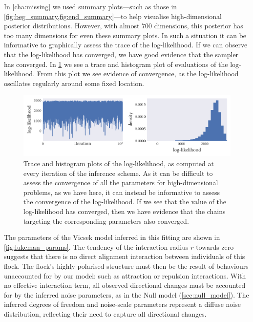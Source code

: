 In \cref{cha:missing} we used summary plots---such as those in
\cref{fig:beg_summary,fig:end_summary}---to help visualise high-dimensional
posterior distributions. However, with almost $700$ dimensions, this posterior
has too many dimensions for even these summary plots. In such a situation it
can be informative to graphically assess the trace of the log-likelihood. If we
can observe that the log-likelihood has converged, we have good evidence that
the sampler has converged. In \cref{fig:log_ll} we see a trace and histogram
plot of evaluations of the log-likelihood. From this plot we see evidence of
convergence, as the log-likelihood oscillates regularly around some fixed
location.

\begin{figure}[tb]
  \includegraphics{log_likelihood.pdf}
  \caption{Trace and histogram plots of the log-likelihood, as computed at
    every iteration of the inference scheme. As it can be difficult to assess
    the convergence of all the parameters for high-dimensional problems, as
    we have here, it can instead be informative to assess the convergence of
    the log-likelihood. If we see that the value of the log-likelihood has
    converged, then we have evidence that the chains targeting the corresponding
    parameters also converged.}
    \label{fig:log_ll}
\end{figure}

The parameters of the Vicsek model inferred in this fitting are shown in
\cref{fig:lukeman_params}. The tendency of the interaction radius $r$ towards
zero suggests that there is no direct alignment interaction between individuals
of this flock. The flock's highly polarised structure must then be the result
of behaviours unaccounted for by our model: such as attraction or repulsion
interactions. With no effective interaction term, all observed directional
changes must be accounted for by the inferred noise parameters, as in the Null
model (\cref{sec:null_model}). The inferred degrees of freedom and noise-scale
parameters represent a diffuse noise distribution, reflecting their need to
capture all directional changes.

